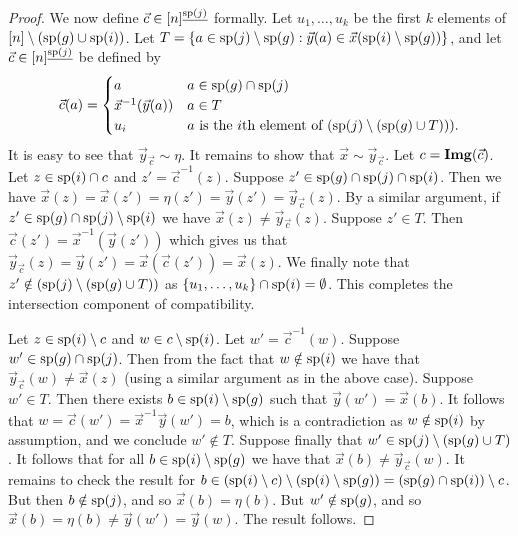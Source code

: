\documentclass[../main/thesis.tex]{subfiles}
\begin{document}
\begin{proof}
  We now define $\vec{c} \in [n]^{\underline{\text{sp}(j)}}$ formally. Let $u_1,
  \ldots , u_k$ be the first $k$ elements of $[n] \setminus (\text{sp}(g) \cup
  \text{sp}(i))$. Let $T = \{a \in \text{sp}(j) \setminus \text{sp}(g) : \vec{y}(a) \in
  \vec{x}(\text{sp}(i) \setminus \text{sp}(g))\}$, and let $\vec{c} \in
  [n]^{\underline{\text{sp}(j)}}$ be defined by
	\[
		\vec{c} (a) =
		\begin{cases}
			a                        & a \in \text{sp}(g) \cap \text{sp}(j)                                     \\
			\vec{x}^{-1}(\vec{y}(a)) & a \in T                                                            \\
			u_{i} & \text{$a$ is the $i$th element of $(\text{sp}(j) \setminus (\text{sp}(g)
        \cup T)))$}.
		\end{cases}
	\]
	It is easy to see that $\vec{y}_{\vec{c}} \sim \eta$. It remains to show that
  $\vec{x} \sim \vec{y}_{\vec{c}}$. Let $c = \text{\textbf{Img}}(\vec{c})$. Let $z \in
  \text{sp}(i) \cap c$ and $z' = \vec{c}^{-1}(z)$. Suppose $z' \in \text{sp}(g)\cap
  \text{sp}(j) \cap \text{sp}(i)$. Then we have $\vec{x}(z) = \vec{x}(z') = \eta (z')
  = \vec{y}(z') = \vec{y}_{\vec{c}}(z)$. By a similar argument, if $z' \in
  \text{sp}(g) \cap \text{sp}(j) \setminus \text{sp}(i)$ we have $\vec{x}(z) \neq
  \vec{y}_{\vec{c}}(z)$. Suppose $z' \in T$. Then $\vec{c}(z') =
  \vec{x}^{-1}(\vec{y}(z'))$ which gives us that $\vec{y}_{\vec{c}}(z) =
  \vec{y}(z') = \vec{x}(\vec{c}(z')) = \vec{x}(z)$. We finally note that $z'
  \notin (\text{sp}(j) \setminus (\text{sp}(g) \cup T))$ as $\{u_1 , \ldots , u_k\}
  \cap \text{sp}(i) = \emptyset$. This completes the intersection component of
  compatibility.
		
	Let $z \in \text{sp}(i) \setminus c$ and $w \in c \setminus \text{sp}(i)$. Let $w' =
  \vec{c}^{-1}(w)$. Suppose $w' \in \text{sp}(g) \cap \text{sp}(j)$. Then from the
  fact that $w \notin \text{sp}(i)$ we have that $\vec{y}_{\vec{c}}(w) \neq
  \vec{x}(z)$ (using a similar argument as in the above case). Suppose $w' \in
  T$. Then there exists $b \in \text{sp}(i) \setminus \text{sp}(g)$ such that
  $\vec{y}(w') = \vec{x}(b)$. It follows that $w = \vec{c}(w') =
  \vec{x}^{-1}\vec{y} (w') = b$, which is a contradiction as $w \notin
  \text{sp}(i)$ by assumption, and we conclude $w' \notin T$. Suppose finally that
  $w' \in \text{sp}(j) \setminus (\text{sp}(g) \cup T)$. It follows that for all $b
  \in \text{sp}(i) \setminus \text{sp}(g)$ we have that $\vec{x}(b) \neq
  \vec{y}_{\vec{c}}(w)$. It remains to check the result for $b \in (\text{sp}(i)
  \setminus c) \setminus (\text{sp}(i) \setminus \text{sp}(g)) = (\text{sp}(g) \cap
  \text{sp}(i)) \setminus c$. But then $b \notin \text{sp}(j)$, and so $\vec{x}(b) =
  \eta (b)$. But $w' \notin \text{sp}(g)$, and so $\vec{x}(b) = \eta(b) \neq
  \vec{y}(w') = \vec{y}(w)$. The result follows.
\end{proof}
\end{document}
